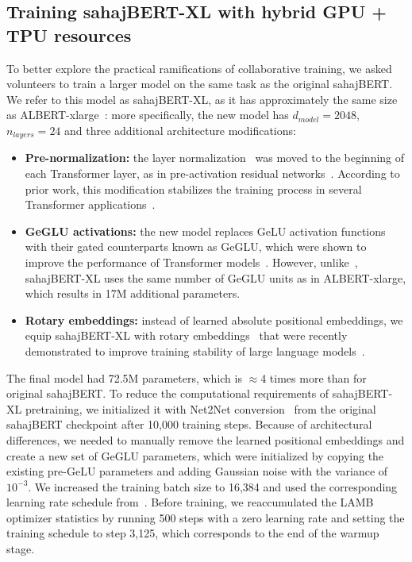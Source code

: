 \subsection{Training sahajBERT-XL with hybrid GPU + TPU resources}
\label{appendix:xl}

To better explore the practical ramifications of collaborative training, we asked volunteers to train a larger model on the same task as the original sahajBERT. We refer to this model as sahajBERT-XL, as it has approximately the same size as ALBERT-xlarge~\cite{albert}: more specifically, the new model has $d_{model}=2048$, $n_{layers}=24$ and three additional architecture modifications:

\vspace{-4pt}
\begin{itemize}[leftmargin=*]
    \item \textbf{Pre-normalization:} the layer normalization~\cite{ba2016layer} was moved to the beginning of each Transformer layer, as in pre-activation residual networks~\cite{he2016identity}. According to prior work, this modification stabilizes the training process in several Transformer applications~\cite{radford2019language,2020t5}.
    \item \textbf{GeGLU activations:} the new model replaces GeLU activation functions with their gated counterparts known as GeGLU, which were shown to improve the performance of Transformer models~\cite{shazeer2020glu,Narang2021DoTM}. However, unlike~\cite{shazeer2020glu}, sahajBERT-XL uses the same number of GeGLU units as in ALBERT-xlarge, which results in 17M additional parameters.
    \item \textbf{Rotary embeddings:} instead of learned absolute positional embeddings, we equip sahajBERT-XL with rotary embeddings~\cite{su2021roformer} that were recently demonstrated to improve training stability of large language models~\cite{rope-eleutherai}.
\end{itemize}
\vspace{-4pt}

The final model had 72.5M parameters, which is $\approx$4 times more than for original sahajBERT. To reduce the computational requirements of sahajBERT-XL pretraining, we initialized it with Net2Net conversion~\cite{net2net} from the original sahajBERT checkpoint after 10,000 training steps. Because of architectural differences, we needed to manually remove the learned positional embeddings and create a new set of GeGLU parameters, which were initialized by copying the existing pre-GeLU parameters and adding Gaussian noise with the variance of $10^{-3}$. 
We increased the training batch size to 16,384 and used the corresponding learning rate schedule from~\cite{lamb}. Before training, we reaccumulated the LAMB optimizer statistics by running 500 steps with a zero learning rate and setting the training schedule to step 3{,}125, which corresponds to the end of the warmup stage.

